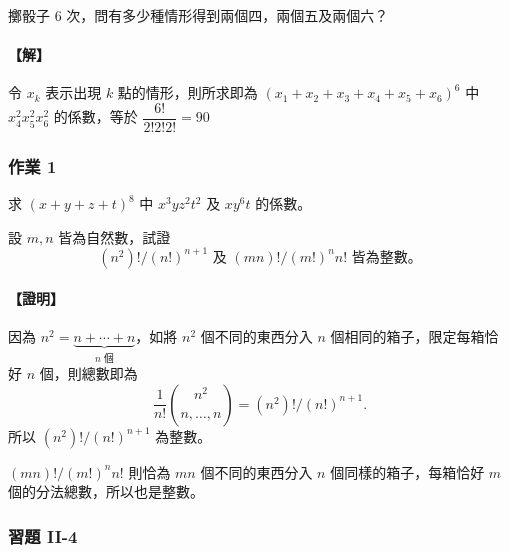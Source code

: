 \medskip
\begin{example}\label{ex:b5-2-23}
擲骰子 6 次，問有多少種情形得到兩個四，兩個五及兩個六？
\end{example}
\paragraph{【解】}
令 $x_k$ 表示出現 $k$ 點的情形，則所求即為 $(x_1 + x_2 + x_3 + x_4 + x_5 + x_6)^6$ 中 $x_4^2 x_5^2 x_6^2$ 的係數，等於 $\dfrac{6!}{2! 2! 2!} = 90$

\medskip
\subsubsection*{作業 1}
\label{hw:b5-2-1}求 $(x + y + z + t)^8$ 中 $x^3 y z^2 t^2$ 及 $x y^6 t$ 的係數。

\medskip
\begin{example}\label{ex:b5-2-24}
設 $m, n$ 皆為自然數，試證
\[ (n^2)! / (n!)^{n+1} \text{ 及 } (mn)! / (m!)^n n! \text{ 皆為整數。} \]
\end{example}
\paragraph{【證明】}
因為 $n^2 = \underbrace{n + \dotsb + n}_{n\text{ 個}}$，如將 $n^2$ 個不同的東西分入 $n$ 個相同的箱子，限定每箱恰好 $n$ 個，則總數即為
\[ \frac{1}{n!} \binom{n^2}{n, \dots, n} = (n^2)! / (n!)^{n+1}. \]
所以 $(n^2)! / (n!)^{n+1}$ 為整數。

$(mn)! / (m!)^n n!$ 則恰為 $mn$ 個不同的東西分入 $n$ 個同樣的箱子，每箱恰好 $m$ 個的分法總數，所以也是整數。

\subsubsection*{習題 II-4}\label{sec:b5-ex2-4}

